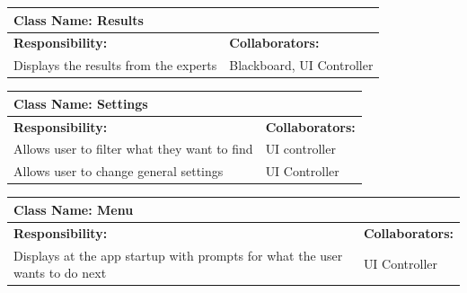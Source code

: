 \documentclass[]{article}
\begin{document}
	\begin{table}[h!]
		\centering
		\begin{tabular}{|p{5cm}|p{5cm}|}
		\hline 
		 \multicolumn{2}{|l|}{\textbf{Class Name:} Results} \\
		\hline
		\textbf{Responsibility:} & \textbf{Collaborators:} \\\hline
		Displays the results from the experts & Blackboard, UI Controller\\
		\hline
		\end{tabular}
	\end{table}
	
	\begin{table}[h!]
		\centering
		\begin{tabular}{|p{5cm}|p{5cm}|}
		\hline 
		 \multicolumn{2}{|l|}{\textbf{Class Name:} Settings} \\
		\hline
		\textbf{Responsibility:} & \textbf{Collaborators:} \\\hline
		Allows user to filter what they want to find & UI controller\\
		\hline
		Allows user to change general settings & UI Controller \\
		\hline
		\end{tabular}
	\end{table}
	
	\begin{table}[h!]
		\centering
		\begin{tabular}{|p{5cm}|p{5cm}|}
		\hline 
		 \multicolumn{2}{|l|}{\textbf{Class Name:} Menu} \\
		\hline
		\textbf{Responsibility:} & \textbf{Collaborators:} \\\hline
		Displays at the app startup with prompts for what the user wants to do next & UI Controller\\
		\hline
		\end{tabular}
	\end{table}
\end{document}
